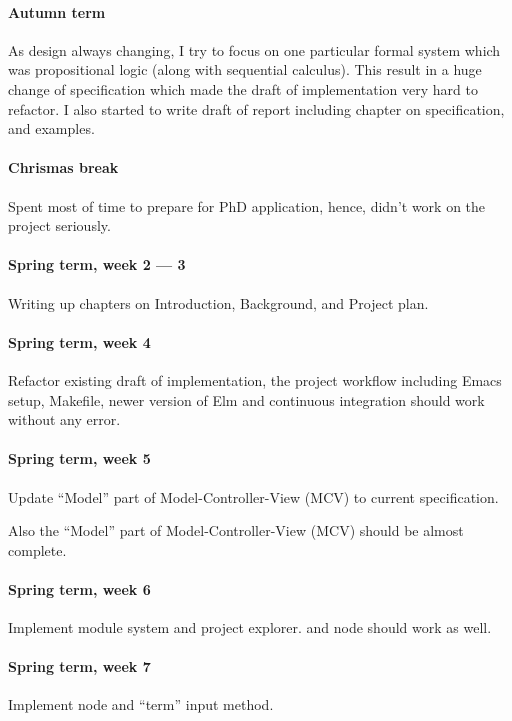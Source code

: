 \paragraph{Autumn term} As design always changing, I try to focus on one particular formal system which was propositional logic (along with sequential calculus). This result in a huge change of specification which made the draft of implementation very hard to refactor. I also started to write draft of report including chapter on specification, and examples.

\paragraph{Chrismas break} Spent most of time to prepare for PhD application, hence, didn't work on the project seriously.

\paragraph{Spring term, week 2 --- 3} Writing up chapters on Introduction, Background, and Project plan.

\paragraph{Spring term, week 4} Refactor existing draft of implementation, the project workflow including Emacs setup, Makefile, newer version of Elm and continuous integration should work without any error.

\paragraph{Spring term, week 5} Update ``Model'' part of Model-Controller-View (MCV) to current specification.

Also the ``Model'' part of Model-Controller-View (MCV) should be almost complete.

\paragraph{Spring term, week 6} Implement module system and project explorer. \kOpen and \kComment node should work as well.

\paragraph{Spring term, week 7} Implement \kInductive \kGrammar node and ``term'' input method.

